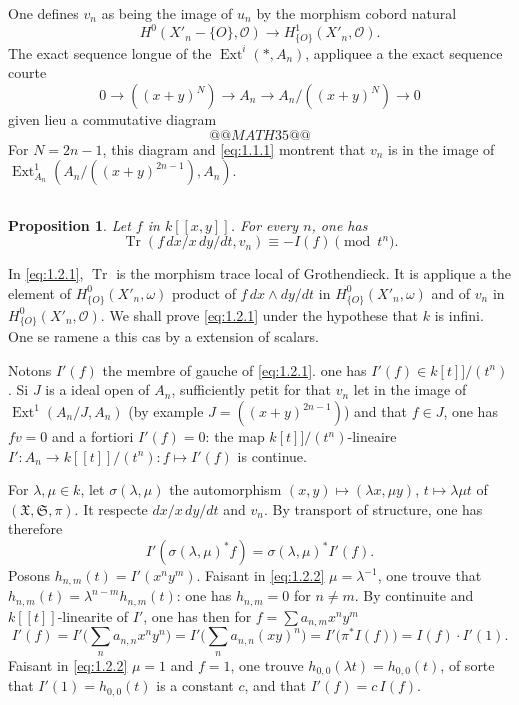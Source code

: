 \documentclass[12pt,a4paper]{article}
\theoremstyle{plain}
\newtheorem{proposition}{Proposition}
\theoremstyle{definition}
\theoremstyle{remark}
\DeclareMathOperator{\Ext}{Ext}
\DeclareMathOperator{\Tr}{Tr}
\newcommand{\OO}{\mathcal{O}}
\providecommand{\Ext}{\operatorname{Ext}}
\providecommand{\Tr}{\operatorname{Tr}}
\begin{document}
One defines $v_n$ as being the image of $u_n$ by the morphism cobord natural
\[
H^0(X'_n-\{O\},\OO)\to H^1_{\{O\}}(X'_n,\OO).
\]
The exact sequence longue of the $\Ext^i(*,A_n)$, appliquee a the exact sequence courte
\[
0\to ((x+y)^N)\to A_n\to A_n/((x+y)^N)\to 0
\]
given lieu a commutative diagram
\[
@@MATH35@@
\]
For $N=2n-1$, this diagram and \eqref{eq:1.1.1} montrent that $v_n$ is in the image of
$\Ext^1_{A_n}(A_n/((x+y)^{2n-1}),A_n)$.

\subsection{}

\begin{proposition}\label{prop:1.2}
Let $f$ in $k[[x,y]]$. For every $n$, one has
\begin{equation}\label{eq:1.2.1}
\Tr(f\,dx/x\,dy/dt, v_n)\equiv -I(f)\pmod{t^n}.
\end{equation}
\end{proposition}

In \eqref{eq:1.2.1}, $\Tr$ is the morphism trace local of Grothendieck. It is
applique a the element of $H^0_{\{O\}}(X'_n,\omega)$ product of $f\,dx\wedge dy/dt$ in
$H^0_{\{O\}}(X'_n,\omega)$ and of $v_n$ in $H^0_{\{O\}}(X'_n,\OO)$. We shall prove
\eqref{eq:1.2.1} under the hypothese that $k$ is infini. One se ramene a this cas by a
extension of scalars.

Notons $I'(f)$ the membre of gauche of \eqref{eq:1.2.1}. one has
$I'(f)\in k[t]]/(t^n)$. Si $J$ is a ideal open of $A_n$, sufficiently petit for that $v_n$
let in the image of $\Ext^1(A_n/J,A_n)$ (by example $J=((x+y)^{2n-1})$) and that
$f\in J$, one has $fv=0$ and a fortiori $I'(f)=0$: the map $k[t]]/(t^n)$-lineaire
$I':A_n\to k[[t]]/(t^n):f\mapsto I'(f)$ is continue.

For $\lambda,\mu\in k$, let $\sigma(\lambda,\mu)$ the automorphism
$(x,y)\mapsto(\lambda x,\mu y)$, $t\mapsto\lambda\mu t$ of $(\mathfrak{X},\mathfrak{S},\pi)$.
It respecte $dx/x\,dy/dt$ and $v_n$. By transport of structure, one has therefore
\begin{equation}\label{eq:1.2.2}
I'(\sigma(\lambda,\mu)^*f)=\sigma(\lambda,\mu)^*I'(f).
\end{equation}
Posons $h_{n,m}(t)=I'(x^ny^m)$. Faisant in \eqref{eq:1.2.2} $\mu=\lambda^{-1}$, one trouve that
$h_{n,m}(t)=\lambda^{n-m}h_{n,m}(t)$: one has $h_{n,m}=0$ for $n\neq m$. By continuite and
$k[[t]]$-linearite of $I'$, one has then for $f=\sum a_{n,m}x^ny^m$
\[
I'(f)=I'\bigl(\sum_n a_{n,n}x^ny^n\bigr)=I'\bigl(\sum_n a_{n,n}(xy)^n\bigr)=I'\bigl(\pi^*I(f)\bigr)=I(f)\cdot I'(1).
\]
Faisant in \eqref{eq:1.2.2} $\mu=1$ and $f=1$, one trouve $h_{0,0}(\lambda t)=h_{0,0}(t)$,
of sorte that $I'(1)=h_{0,0}(t)$ is a constant $c$, and that $I'(f)=c\,I(f)$.
\end{document}
